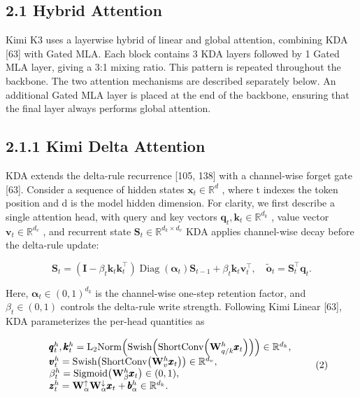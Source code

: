\documentclass[
  10
]{article}
\begin{document}
\subsection{2.1 Hybrid Attention}\label{hybrid-attention}

Kimi K3 uses a layerwise hybrid of linear and global attention,
combining KDA {[}63{]} with Gated MLA. Each block contains 3 KDA layers
followed by 1 Gated MLA layer, giving a 3:1 mixing ratio. This pattern
is repeated throughout the backbone. The two attention mechanisms are
described separately below. An additional Gated MLA layer is placed at
the end of the backbone, ensuring that the final layer always performs
global attention.

\subsection{2.1.1 Kimi Delta Attention}\label{kimi-delta-attention}

KDA extends the delta-rule recurrence {[}105, 138{]} with a channel-wise
forget gate {[}63{]}. Consider a sequence of hidden states
\(\pmb { x } _ { t } \in \mathbb { R } ^ { d }\) , where t indexes the
token position and d is the model hidden dimension. For clarity, we
first describe a single attention head, with query and key vectors
\(\boldsymbol { q } _ { t } , \boldsymbol { k } _ { t } \in \mathbb { R } ^ { d _ { k } }\)
, value vector \(\pmb { v } _ { t } \in \mathbb { R } ^ { d _ { v } }\)
, and recurrent state
\(\mathbf { S } _ { t } \in \mathbb { R } ^ { d _ { k } \times d _ { v } }\)
KDA applies channel-wise decay before the delta-rule update:

\[
\mathbf {S} _ {t} = \left(\mathbf {I} - \beta_ {t} \boldsymbol {k} _ {t} \boldsymbol {k} _ {t} ^ {\top}\right) \operatorname{Diag} (\boldsymbol {\alpha} _ {t}) \mathbf {S} _ {t - 1} + \beta_ {t} \boldsymbol {k} _ {t} \boldsymbol {v} _ {t} ^ {\top}, \quad \tilde {\boldsymbol {o}} _ {t} = \mathbf {S} _ {t} ^ {\top} \boldsymbol {q} _ {t}.\tag{1}
\]

Here, \(\pmb { \alpha } _ { t } \in ( 0 , 1 ) ^ { d _ { k } }\) is the
channel-wise one-step retention factor, and
\(\beta _ { t } \in ( 0 , 1 )\) controls the delta-rule write strength.
Following Kimi Linear {[}63{]}, KDA parameterizes the per-head
quantities as

\[
\begin{array}{r l} & {\pmb {q} _ {t} ^ {h}, \pmb {k} _ {t} ^ {h} = \mathrm{L} _ {2} \mathrm{Norm} \Big (\mathrm{Swish} \Big (\mathrm{ShortConv} \Big (\mathbf {W} _ {q / k} ^ {h} \pmb {x} _ {t} \Big) \Big) \Big) \in \mathbb {R} ^ {d _ {k}},} \\ & {\pmb {v} _ {t} ^ {h} = \mathrm{Swish} \big (\mathrm{ShortConv} \big (\mathbf {W} _ {v} ^ {h} \pmb {x} _ {t} \big) \big) \in \mathbb {R} ^ {d _ {v}},} \\ & {\beta_ {t} ^ {h} = \mathrm{Sigmoid} \big (\mathbf {W} _ {\beta} ^ {h} \pmb {x} _ {t} \big) \in (0, 1),} \\ & {\pmb {z} _ {t} ^ {h} = \mathbf {W} _ {\alpha} ^ {\uparrow} \mathbf {W} _ {\alpha} ^ {\downarrow} \pmb {x} _ {t} + \pmb {b} _ {\alpha} ^ {h} \in \mathbb {R} ^ {d _ {k}}.} \end{array}\tag{2}
\]
\end{document}
